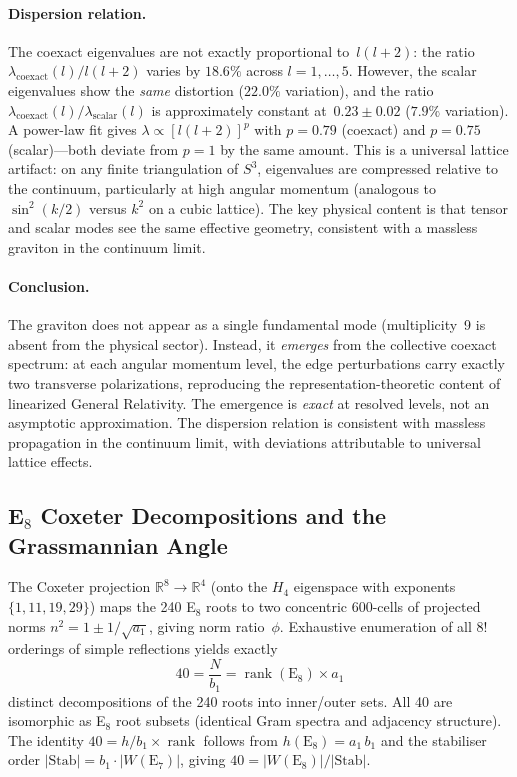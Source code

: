 \documentclass[12pt,a4paper]{article}
\theoremstyle{definition}
\begin{document}
\paragraph{Dispersion relation.}
The coexact eigenvalues are not exactly proportional to~$l(l+2)$: the ratio $\lambda_{\mathrm{coexact}}(l)/l(l+2)$ varies by $18.6\%$ across $l = 1, \ldots, 5$.  However, the scalar eigenvalues show the \emph{same} distortion ($22.0\%$ variation), and the ratio $\lambda_{\mathrm{coexact}}(l)/\lambda_{\mathrm{scalar}}(l)$ is approximately constant at~$0.23 \pm 0.02$ ($7.9\%$ variation).  A power-law fit gives $\lambda \propto [l(l+2)]^p$ with $p = 0.79$ (coexact) and $p = 0.75$ (scalar)---both deviate from $p = 1$ by the same amount.  This is a universal lattice artifact: on any finite triangulation of $S^3$, eigenvalues are compressed relative to the continuum, particularly at high angular momentum (analogous to $\sin^2(k/2)$ versus $k^2$ on a cubic lattice).  The key physical content is that tensor and scalar modes see the same effective geometry, consistent with a massless graviton in the continuum limit.

\paragraph{Conclusion.}
The graviton does not appear as a single fundamental mode (multiplicity~9 is absent from the physical sector).  Instead, it \emph{emerges} from the collective coexact spectrum: at each angular momentum level, the edge perturbations carry exactly two transverse polarizations, reproducing the representation-theoretic content of linearized General Relativity.  The emergence is \emph{exact} at resolved levels, not an asymptotic approximation.  The dispersion relation is consistent with massless propagation in the continuum limit, with deviations attributable to universal lattice effects.


\subsection{E\texorpdfstring{$_8$}{8} Coxeter Decompositions and the Grassmannian Angle}
\label{sec:S-grassmannian}

The Coxeter projection $\mathbb{R}^8 \to \mathbb{R}^4$ (onto the $H_4$ eigenspace with exponents $\{1,11,19,29\}$) maps the 240 E$_8$ roots to two concentric 600-cells of projected norms $n^2 = 1 \pm 1/\sqrt{a_1}$, giving norm ratio~$\phi$.  Exhaustive enumeration of all $8!$ orderings of simple reflections yields exactly
\begin{equation}
40 = \frac{N}{b_1} = \operatorname{rank}(\mathrm{E}_8) \times a_1
\label{eq:40decomp}
\end{equation}
distinct decompositions of the 240 roots into inner/outer sets.  All 40 are isomorphic as E$_8$ root subsets (identical Gram spectra and adjacency structure).  The identity $40 = h/b_1 \times \operatorname{rank}$ follows from $h(\mathrm{E}_8) = a_1 \, b_1$ and the stabiliser order $|\mathrm{Stab}| = b_1 \cdot |W(\mathrm{E}_7)|$, giving $40 = |W(\mathrm{E}_8)|/|\mathrm{Stab}|$.
\end{document}
